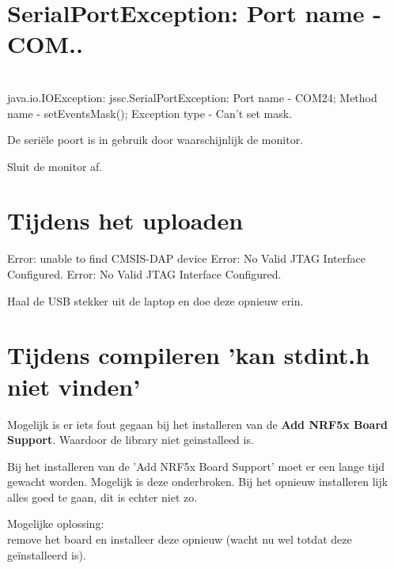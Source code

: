 \section{SerialPortException: Port name - COM..}~\\
java.io.IOException: jssc.SerialPortException: Port name - COM24; Method name - setEventsMask(); Exception type - Can't set mask.

De seriële poort is in gebruik door waarschijnlijk de monitor.

Sluit de monitor af.
 
 
\section{Tijdens het uploaden}
 Error: unable to find CMSIS-DAP device
 Error: No Valid JTAG Interface Configured.
 Error: No Valid JTAG Interface Configured.
 
 Haal de USB stekker uit de laptop en doe deze opnieuw erin.
 
 \section{Tijdens compileren  'kan stdint.h niet vinden'}
 Mogelijk is er iets fout gegaan bij het installeren van de \textbf{Add NRF5x Board Support}. Waardoor de library niet geinstalleed is.
 
 Bij het installeren van de 'Add NRF5x Board Support' moet er een lange tijd gewacht worden. Mogelijk is deze onderbroken. Bij het opnieuw installeren lijk alles goed te gaan, dit is echter niet zo.
 
 Mogelijke oplossing:\\
 remove het board en installeer deze opnieuw (wacht nu wel totdat deze geïnstalleerd is).
 
 